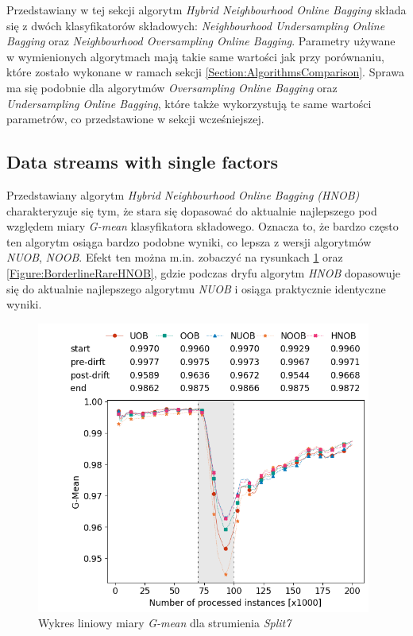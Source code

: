 \noindent Przedstawiany w tej sekcji algorytm \textit{Hybrid Neighbourhood Online Bagging} składa się z dwóch klasyfikatorów składowych: \textit{Neighbourhood Undersampling Online Bagging} oraz \textit{Neighbourhood Oversampling Online Bagging}. Parametry używane w wymienionych algorytmach mają takie same wartości jak przy porównaniu, które zostało wykonane w ramach sekcji \ref{Section:AlgorithmsComparison}. Sprawa ma się podobnie dla algorytmów \textit{Oversampling Online Bagging} oraz \textit{Undersampling Online Bagging}, które także wykorzystują te same wartości parametrów, co przedstawione w sekcji wcześniejszej.

\subsection{Data streams with single factors}

\noindent Przedstawiany algorytm \textit{Hybrid Neighbourhood Online Bagging (HNOB)} charakteryzuje się tym, że stara się dopasować do aktualnie najlepszego pod względem miary \textit{G-mean} klasyfikatora składowego. Oznacza to, że bardzo często ten algorytm osiąga bardzo podobne wyniki, co lepsza z wersji algorytmów \textit{NUOB}, \textit{NOOB}. Efekt ten można m.in. zobaczyć na rysunkach \ref{Figure:Split7} oraz \ref{Figure:BorderlineRareHNOB}, gdzie podczas dryfu algorytm \textit{HNOB} dopasowuje się do aktualnie najlepszego algorytmu \textit{NUOB} i osiąga praktycznie identyczne wyniki.

\begin{figure}[h]
    \centering
    \includegraphics[width=11cm]{figures/split7_gmean.png}
    \caption{Wykres liniowy miary \textit{G-mean} dla strumienia \textit{Split7}}\label{Figure:Split7}
\end{figure}

